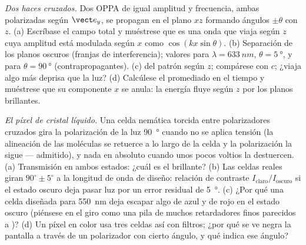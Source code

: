 \begin{exercise}[$\star\star\star$]\label{exo:b2:plane-waves-polarization:10}
\emph{Dos haces cruzados.} Dos OPPA de igual amplitud y frecuencia, ambas
polarizadas según $\vect e_y$, se propagan en el plano $xz$ formando ángulos
$\pm\theta$ con $z$. (a) Escríbase el campo total y muéstrese que es una
onda que viaja según $z$ cuya amplitud está modulada según $x$ como
$\cos(kx\sin\theta)$. (b) Separación de los planos oscuros (franjas de
interferencia); valores para $\lambda = \qty{633}{nm}$, $\theta = \qty{5}{\degree}$, y para
$\theta = \qty{90}{\degree}$ (contrapropagantes). (c)  del
patrón según $z$; compárese con $c$; ¿viaja algo más deprisa que la luz?
(d) Calcúlese el  promediado en el tiempo y muéstrese
que su componente $x$ se anula: la energía fluye según $z$ por los planos brillantes.
\end{exercise}

\begin{exercise}[$\star\star\star$]\label{exo:b2:plane-waves-polarization:11}
\emph{El píxel de cristal líquido.} Una celda nemática torcida entre
polarizadores cruzados gira la polarización de la luz \qty{90}{\degree}
cuando no se aplica tensión (la alineación de las moléculas se retuerce a
lo largo de la celda y la polarización la sigue --- admitido), y nada en
absoluto cuando unos pocos voltios la destuercen. (a) Transmisión en ambos
estados: ¿cuál es el brillante? (b) Las celdas reales giran $90^\circ \pm 5^\circ$ a la
longitud de onda de diseño: relación de contraste $I_{\text{claro}}/I_{\text{oscuro}}$ si el estado
oscuro deja pasar luz por un error residual de \qty{5}{\degree}. (c) ¿Por qué una celda
diseñada para \qty{550}{nm} deja escapar algo de azul y de rojo en el
estado oscuro (piénsese en el giro como una pila de muchos retardadores
finos parecidos a )? (d) Un píxel en color usa tres
celdas así con filtros; ¿por qué se ve negra la pantalla a través de un
polarizador con cierto ángulo, y qué indica ese ángulo?
\end{exercise}

